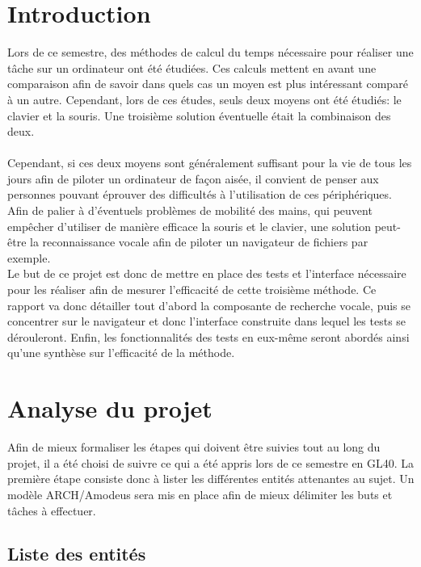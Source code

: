 \documentclass[a4paper, 11pt]{report}
\begin{document}
	\newpage
	
	
	
	\chapter*{Introduction}
	
	Lors de ce semestre, des méthodes de calcul du temps nécessaire pour réaliser une tâche sur un ordinateur ont été étudiées. Ces calculs mettent en avant une comparaison afin de savoir dans quels cas un moyen est plus intéressant comparé à un autre. Cependant, lors de ces études, seuls deux moyens ont été étudiés: le clavier et la souris. Une troisième solution éventuelle était la combinaison des deux.\\ \ \\
	Cependant, si ces deux moyens sont généralement suffisant pour la vie de tous les jours afin de piloter un ordinateur de façon aisée, il convient de penser aux personnes pouvant éprouver des difficultés à l'utilisation de ces périphériques. Afin de palier à d'éventuels problèmes de mobilité des mains, qui peuvent empêcher d'utiliser de manière efficace la souris et le clavier, une solution peut-être la reconnaissance vocale afin de piloter un navigateur de fichiers par exemple.\\
	Le but de ce projet est donc de mettre en place des tests et l'interface nécessaire pour les réaliser afin de mesurer l'efficacité de cette troisième méthode. Ce rapport va donc détailler tout d'abord la composante de recherche vocale, puis se concentrer sur le navigateur et donc l'interface construite dans lequel les tests se dérouleront. Enfin, les fonctionnalités des tests en eux-même seront abordés ainsi qu'une synthèse sur l'efficacité de la méthode.
	
	\chapter{Analyse du projet}
	
	Afin de mieux formaliser les étapes qui doivent \^etre suivies tout au long du projet, il a été choisi de suivre ce qui a été appris lors de ce semestre en GL40. La première étape consiste donc à lister les différentes entités attenantes au sujet. Un modèle ARCH/Amodeus sera mis en place afin de mieux délimiter les buts et tâches à effectuer.\\
	
		\section{Liste des entités}
		
\end{document}
